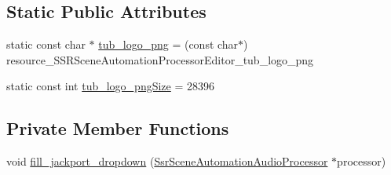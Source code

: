 \subsection*{Static Public Attributes}
\begin{DoxyCompactItemize}
\item 
static const char $\ast$ \hyperlink{classSSRSceneAutomationProcessorEditor_ab6a8a9ff45ef50aa206d4702ad25f53c}{tub\-\_\-logo\-\_\-png} = (const char$\ast$) resource\-\_\-\-S\-S\-R\-Scene\-Automation\-Processor\-Editor\-\_\-tub\-\_\-logo\-\_\-png
\item 
static const int \hyperlink{classSSRSceneAutomationProcessorEditor_ac5570c4666280cb9a09ffa8464f6a1e3}{tub\-\_\-logo\-\_\-png\-Size} = 28396
\end{DoxyCompactItemize}
\subsection*{Private Member Functions}
\begin{DoxyCompactItemize}
\item 
void \hyperlink{classSSRSceneAutomationProcessorEditor_ae1a2d27acb0671fbc738d855a77de9dd}{fill\-\_\-jackport\-\_\-dropdown} (\hyperlink{classSsrSceneAutomationAudioProcessor}{Ssr\-Scene\-Automation\-Audio\-Processor} $\ast$processor)
\end{DoxyCompactItemize}
